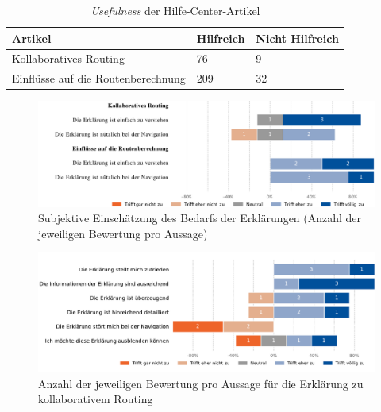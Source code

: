 \begin{table}[htb!]
    \centering
    \begin{tabular}{p{}p{}p{}}
        \hline
        Artikel & Hilfreich & Nicht Hilfreich \\
        \toprule
        Kollaboratives Routing & 76 & 9 \\
        Einflüsse auf die Routenberechnung & 209 & 32 \\
        \bottomrule
    \end{tabular}
    \caption{\textit{Usefulness} der Hilfe-Center-Artikel}
    \label{tab:explanation_results_clicked}
\end{table}

\begin{figure}[htb!]
    \centering
    \includegraphics[width=\textwidth]{contents/06_model_evaluation/02_evaluation/res/qualitativeFeedback-evaluation_usefulness_qualitative.pdf}
    \caption{Subjektive Einschätzung des Bedarfs der Erklärungen (Anzahl der jeweiligen Bewertung pro Aussage)}
    \label{fig:evaluation_usefulness_qualitative}
\end{figure}

\begin{figure}[htb!]
    \centering
    \includegraphics[width=\textwidth]{contents/06_model_evaluation/02_evaluation/res/qualitativeFeedback-01_collaborative_routing_short.pdf}
    \caption{Anzahl der jeweiligen Bewertung pro Aussage für die Erklärung zu kollaborativem Routing}
    \label{fig:01_collaborative_routing_short}
\end{figure}

